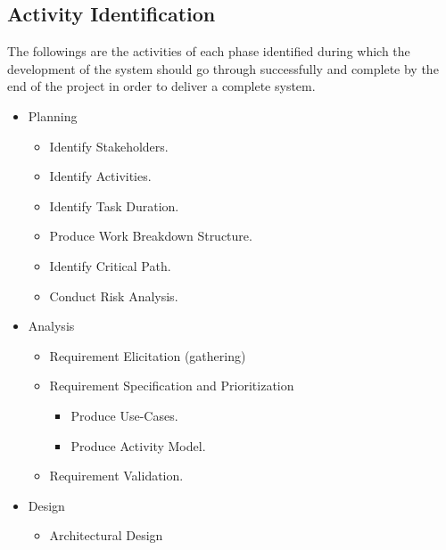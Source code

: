 \subsection{Activity Identification}
\begin{justify}
    The followings are the activities of each phase identified during which the development of the system should go through successfully and complete by the end of the project in order to deliver a complete system.\\
    \begin{itemize}[itemsep=-0.4cm]
        \item Planning \vspace{-0.3cm}
            \begin{itemize}[itemsep=-0.3cm]
                \item Identify Stakeholders.
                \item Identify Activities.
                \item Identify Task Duration.
                \item Produce Work Breakdown Structure.
                \item Identify Critical Path.
                \item Conduct Risk Analysis.
            \end{itemize}
        \item Analysis \vspace{-0.35cm}
            \begin{itemize}[itemsep=-0.3cm]
                \item Requirement Elicitation (gathering)
                \item Requirement Specification and Prioritization \vspace{-0.3cm}
                    \begin{itemize}[itemsep=-0.3cm]
                        \item Produce Use-Cases.
                        \item Produce Activity Model.
                    \end{itemize}
                \item Requirement Validation.
            \end{itemize}
        \item Design \vspace{-0.35cm}
            \begin{itemize}[itemsep=-0.3cm]
                \item Architectural Design

\end{itemize}
\end{itemize}
\end{justify}

